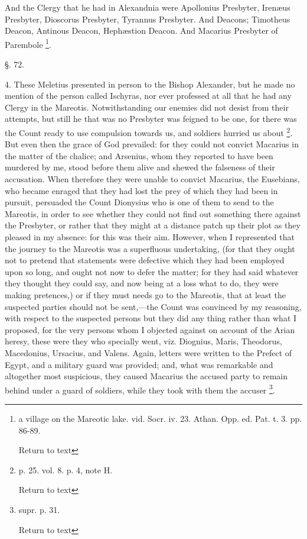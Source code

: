 And the Clergy that he had in Alexandnia were
Apollonius Presbyter,
Irenæus Presbyter, Dioscorus Presbyter, Tyrannus Presbyter. And
Deacons; Timotheus Deacon, Antinous Deacon, Hephæstion Deacon. And
Macarius Presbyter of Parembole \footnote{a village on the Mareotic lake. vid. Socr. iv. 23. Athan. Opp. ed.
Pat. t. 3. pp. 86-89.

Return to text}.

§. 72.

4. These Meletius presented in person to the
Bishop Alexander, but he made no mention of the person called Ischyras,
nor ever professed at all that he had any Clergy in the Mareotis.
Notwithstanding our enemies did not desist from their attempts, but
still he that was no Presbyter was feigned to be one, for there was
the Count ready to use compulsion towards us, and soldiers hurried us
about \footnote{p. 25. vol. 8. p. 4, note H.

Return to text}. But even
then the grace of God prevailed: for they could not convict Macarius
in the matter of the chalice; and Arsenius, whom they reported to have
been murdered by me, stood before them alive and shewed the falseness
of their accusation. When therefore they were unable to convict
Macarius, the Eusebians, who became enraged that they had lost the
prey of which they had been in pursuit, persuaded the Count Dionysius
who is one of them to send to the Mareotis, in order to see whether
they could not find out something there against the Presbyter, or
rather that they might at a distance patch up their plot as they
pleased in my absence: for this was their aim. However, when I
represented that the journey to the Mareotis was a superfluous
undertaking, (for that they ought not to pretend that statements were
defective which they had been employed upon so long, and ought not now
to defer the matter; for they had said whatever they thought they
could say, and now being at a loss what to do, they were making
pretences,) or if they must needs go to the Mareotis, that at least
the suspected parties should not be sent,—the Count was convinced by
my reasoning, with respect to the suspected persons but they did any
thing rather than what I proposed, for the very persons whom I
objected against on account of the Arian heresy, these were they who
specially went, viz. Diognius, Maris, Theodorus, Macedonius, Ursacius,
and Valens. Again, letters were written to the Prefect of Egypt, and a
military guard was provided; and, what was remarkable and altogether
most suspicious, they caused Macarius the accused party to remain
behind under a guard of soldiers, while they took with them the
accuser \footnote{supr. p. 31.

Return to text}.


